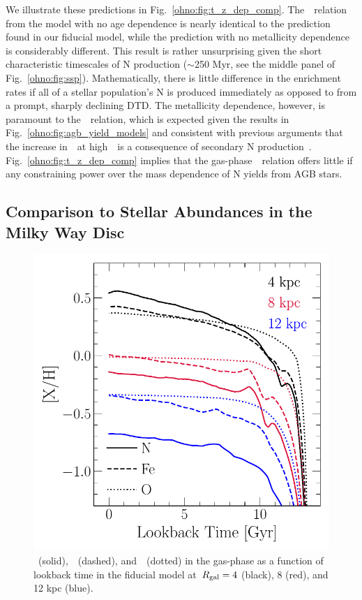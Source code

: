 \par
We illustrate these predictions in Fig.~\ref{ohno:fig:t_z_dep_comp}.
The~\ohno~relation from the model with no age dependence is nearly identical to
the prediction found in our fiducial model, while the prediction with no
metallicity dependence is considerably different.
This result is rather unsurprising given the short characteristic timescales of
N production ($\sim$250 Myr, see the middle panel of Fig.~\ref{ohno:fig:ssp}).
Mathematically, there is little difference in the enrichment rates if all of a
stellar population's N is produced immediately as opposed to from a prompt,
sharply declining DTD.
The metallicity dependence, however, is paramount to the~\ohno~relation, which
is expected given the results in Fig.~\ref{ohno:fig:agb_yield_models} and consistent
with previous arguments that the increase in~\no~at high~\oh~is a consequence
of secondary N production~\citep{VilaCostas1993, vanZee1998, Henry1999,
PerezMontero2009, Berg2012, Pilyugin2012, Andrews2013, HaydenPawson2022}.
Fig.~\ref{ohno:fig:t_z_dep_comp} implies that the gas-phase~\ohno~relation offers
little if any constraining power over the mass dependence of N yields from
AGB stars.

\subsection{Comparison to Stellar Abundances in the Milky Way Disc}
\label{ohno:sec:results:vincenzo_comp}

\begin{figure}
\centering
\includegraphics[scale = 0.6]{nh_feh_vs_lookback.pdf}
\caption{
\nh~(solid),~\feh~(dashed), and~\oh~(dotted) in the gas-phase as a function of
lookback time in the fiducial model at~$R_\text{gal} = 4$ (black), 8 (red), and 12 kpc
(blue).
}
\label{ohno:fig:nh_feh_vs_lookback}
\end{figure}

